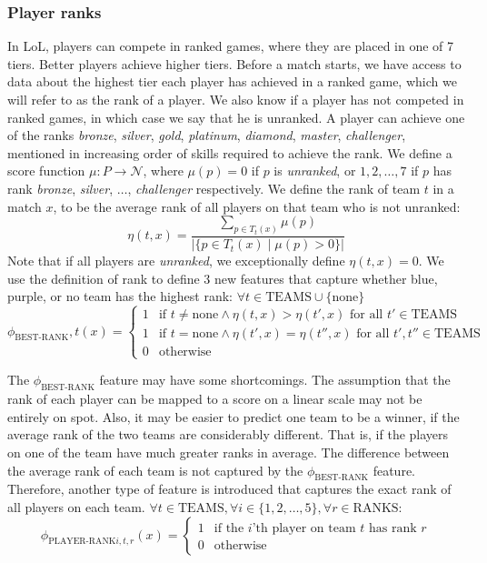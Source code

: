 \subsubsection{Player ranks}
In LoL, players can compete in ranked games, where they are placed in one of 7 tiers. Better players achieve higher tiers.
Before a match starts, we have access to data about the highest tier each player has achieved in a ranked game, which we will refer to as the rank of a player. We also know if a player has not competed in ranked games, in which case we say that he is unranked.
A player can achieve one of the ranks \textit{bronze}, \textit{silver}, \textit{gold}, \textit{platinum}, \textit{diamond}, \textit{master}, \textit{challenger}, mentioned in increasing order of skills required to achieve the rank.
We define a score function $\mu : P \rightarrow \mathcal{N}$, where $\mu(p) = 0$ if $p$ is \textit{unranked}, or $1, 2, \dots, 7$ if $p$ has rank \textit{bronze}, \textit{silver}, $\dots$, \textit{challenger} respectively.
We define the rank of team $t$ in a match $x$, to be the average rank of all players on that team who is not unranked:
\begin{equation}\label{eq:eta}
\eta(t, x) = \frac{\sum\limits_{p \in T_t(x)} \mu(p)}{|\{p \in T_t(x) \mid \mu(p) > 0\}|}
\end{equation}
Note that if all players are \textit{unranked}, we exceptionally define $\eta(t, x) = 0$. We use the definition of rank to define 3 new features that capture whether blue, purple, or no team has the highest rank:
$\forall t \in \text{TEAMS} \cup \{\text{none}\}$
\begin{equation}\label{eq:bestrank}
\phi_\text{BEST-RANK},t(x) = 
\begin{cases} 
  1 & \text{if } t \neq \text{none} \wedge \eta(t,x) > \eta(t',x) \text{ for all } t' \in \text{TEAMS}\\
  1 & \text{if } t = \text{none} \wedge \eta(t',x) = \eta(t'',x) \text{ for all } t',t'' \in \text{TEAMS}\\
  0 & \text{otherwise} 
\end{cases}  
\end{equation}

The $\phi_\text{BEST-RANK}$ feature may have some shortcomings. The assumption that the rank of each player can be mapped to a score on a linear scale may not be entirely on spot.
Also, it may be easier to predict one team to be a winner, if the average rank of the two teams are considerably different. That is, if the players on one of the team have much greater ranks in average. The difference between the average rank of each team is not captured by the $\phi_\text{BEST-RANK}$ feature.
Therefore, another type of feature is introduced that captures the exact rank of all players on each team.
$\forall t \in \text{TEAMS}, \forall i \in \{1,2,\dots,5\}, \forall r \in \text{RANKS}$:
\begin{equation}\label{eq:playerrank}
\phi_{\text{PLAYER-RANK}i,t,r}(x) = 
\begin{cases} 
  1 & \text{if the } i \text{'th player on team } t \text{ has rank } r\\
  0 & \text{otherwise} 
\end{cases}  
\end{equation}


